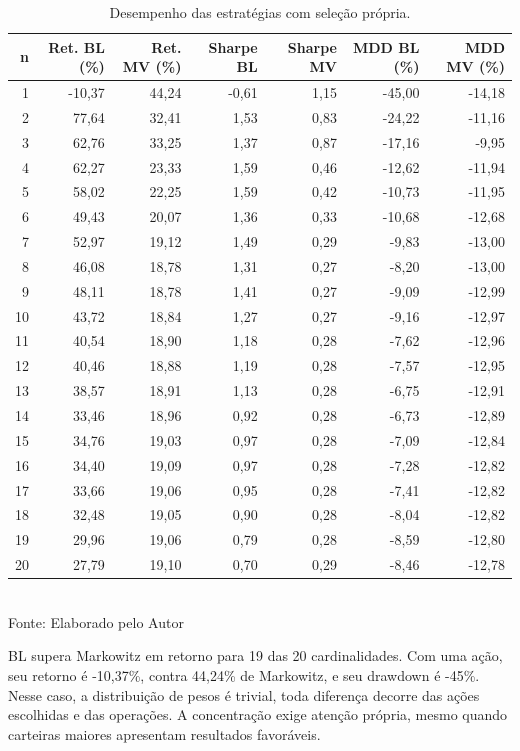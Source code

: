 \begin{table}[H]
\centering
\caption{Desempenho das estratégias com seleção própria.}
\label{tab:selecao_propria}
{\footnotesize
\begin{tabular}{@{}rrrrrrr@{}}
\hline
n & Ret. BL (\%) & Ret. MV (\%) & Sharpe BL & Sharpe MV & MDD BL (\%) & MDD MV (\%) \\ \hline
1 & -10,37 & 44,24 & -0,61 & 1,15 & -45,00 & -14,18 \\
2 & 77,64 & 32,41 & 1,53 & 0,83 & -24,22 & -11,16 \\
3 & 62,76 & 33,25 & 1,37 & 0,87 & -17,16 & -9,95 \\
4 & 62,27 & 23,33 & 1,59 & 0,46 & -12,62 & -11,94 \\
5 & 58,02 & 22,25 & 1,59 & 0,42 & -10,73 & -11,95 \\
6 & 49,43 & 20,07 & 1,36 & 0,33 & -10,68 & -12,68 \\
7 & 52,97 & 19,12 & 1,49 & 0,29 & -9,83 & -13,00 \\
8 & 46,08 & 18,78 & 1,31 & 0,27 & -8,20 & -13,00 \\
9 & 48,11 & 18,78 & 1,41 & 0,27 & -9,09 & -12,99 \\
10 & 43,72 & 18,84 & 1,27 & 0,27 & -9,16 & -12,97 \\
11 & 40,54 & 18,90 & 1,18 & 0,28 & -7,62 & -12,96 \\
12 & 40,46 & 18,88 & 1,19 & 0,28 & -7,57 & -12,95 \\
13 & 38,57 & 18,91 & 1,13 & 0,28 & -6,75 & -12,91 \\
14 & 33,46 & 18,96 & 0,92 & 0,28 & -6,73 & -12,89 \\
15 & 34,76 & 19,03 & 0,97 & 0,28 & -7,09 & -12,84 \\
16 & 34,40 & 19,09 & 0,97 & 0,28 & -7,28 & -12,82 \\
17 & 33,66 & 19,06 & 0,95 & 0,28 & -7,41 & -12,82 \\
18 & 32,48 & 19,05 & 0,90 & 0,28 & -8,04 & -12,82 \\
19 & 29,96 & 19,06 & 0,79 & 0,28 & -8,59 & -12,80 \\
20 & 27,79 & 19,10 & 0,70 & 0,29 & -8,46 & -12,78 \\
\hline
\end{tabular}}\\
Fonte: Elaborado pelo Autor
\end{table}
\newpage
BL supera Markowitz em retorno para 19 das 20 cardinalidades. Com uma ação, seu retorno é -10,37\%, contra 44,24\% de Markowitz, e seu drawdown é -45\%. Nesse caso, a distribuição de pesos é trivial, toda diferença decorre das ações escolhidas e das operações. A concentração exige atenção própria, mesmo quando carteiras maiores apresentam resultados favoráveis.

